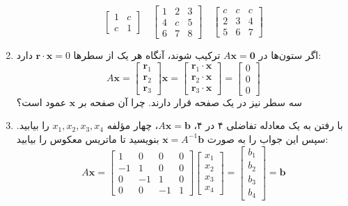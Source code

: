 \documentclass[12pt, a4paper]{book}
\begin{document}
\begin{enumerate}
		\[ \begin{bmatrix} 1 & c \\ c & 1 \end{bmatrix} \quad \begin{bmatrix} 1 & 2 & 3 \\ 4 & c & 5 \\ 6 & 7 & 8 \end{bmatrix} \quad \begin{bmatrix} c & c & c \\ 2 & 3 & 4 \\ 5 & 6 & 7 \end{bmatrix} \]
		\item اگر ستون‌ها در $A\mathbf{x}=\mathbf{0}$ ترکیب شوند، آنگاه هر یک از سطرها $\mathbf{r}\cdot\mathbf{x}=0$ دارد:
		\[ A\mathbf{x} = \begin{bmatrix} \mathbf{r}_1 \\ \mathbf{r}_2 \\ \mathbf{r}_3 \end{bmatrix} \mathbf{x} = \begin{bmatrix} \mathbf{r}_1 \cdot \mathbf{x} \\ \mathbf{r}_2 \cdot \mathbf{x} \\ \mathbf{r}_3 \cdot \mathbf{x} \end{bmatrix} = \begin{bmatrix} 0 \\ 0 \\ 0 \end{bmatrix} \]
		سه سطر نیز در یک صفحه قرار دارند. چرا آن صفحه بر $\mathbf{x}$ عمود است؟
		\item با رفتن به یک معادله تفاضلی ۴ در ۴، $A\mathbf{x}=\mathbf{b}$، چهار مؤلفه $x_1, x_2, x_3, x_4$ را بیابید. سپس این جواب را به صورت $\mathbf{x}=A^{-1}\mathbf{b}$ بنویسید تا ماتریس معکوس را بیابید:
		\[ A\mathbf{x} = \begin{bmatrix} 1 & 0 & 0 & 0 \\ -1 & 1 & 0 & 0 \\ 0 & -1 & 1 & 0 \\ 0 & 0 & -1 & 1 \end{bmatrix} \begin{bmatrix} x_1 \\ x_2 \\ x_3 \\ x_4 \end{bmatrix} = \begin{bmatrix} b_1 \\ b_2 \\ b_3 \\ b_4 \end{bmatrix} = \mathbf{b} \]

\end{enumerate}
\end{document}
